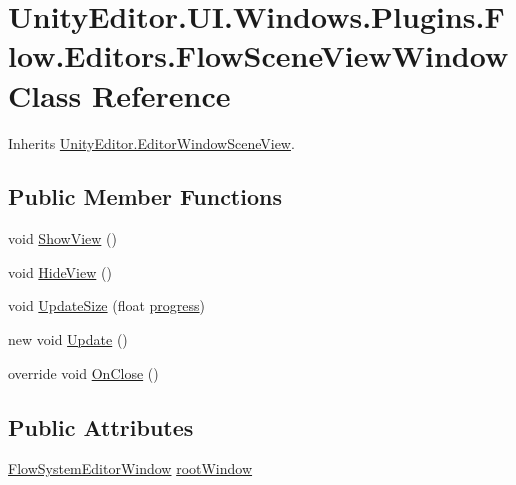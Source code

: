 \hypertarget{class_unity_editor_1_1_u_i_1_1_windows_1_1_plugins_1_1_flow_1_1_editors_1_1_flow_scene_view_window}{}\section{Unity\+Editor.\+U\+I.\+Windows.\+Plugins.\+Flow.\+Editors.\+Flow\+Scene\+View\+Window Class Reference}
\label{class_unity_editor_1_1_u_i_1_1_windows_1_1_plugins_1_1_flow_1_1_editors_1_1_flow_scene_view_window}


Inherits \hyperlink{class_unity_editor_1_1_editor_window_scene_view}{Unity\+Editor.\+Editor\+Window\+Scene\+View}.

\subsection*{Public Member Functions}
\begin{DoxyCompactItemize}
\item 
void \hyperlink{class_unity_editor_1_1_u_i_1_1_windows_1_1_plugins_1_1_flow_1_1_editors_1_1_flow_scene_view_window_abb0703fa7357f3768e2c08521a65cb71}{Show\+View} ()
\item 
void \hyperlink{class_unity_editor_1_1_u_i_1_1_windows_1_1_plugins_1_1_flow_1_1_editors_1_1_flow_scene_view_window_a67296aa0683ffed4fefd23a75face958}{Hide\+View} ()
\item 
void \hyperlink{class_unity_editor_1_1_u_i_1_1_windows_1_1_plugins_1_1_flow_1_1_editors_1_1_flow_scene_view_window_ac05cdeacadf465f54be8dcbd2f5a0c4e}{Update\+Size} (float \hyperlink{class_unity_editor_1_1_editor_window_scene_view_ac23a4737866653a41e680de245a58eff}{progress})
\item 
new void \hyperlink{class_unity_editor_1_1_u_i_1_1_windows_1_1_plugins_1_1_flow_1_1_editors_1_1_flow_scene_view_window_a5abd89b0372fba7bc4aef03cf4e9d763}{Update} ()
\item 
override void \hyperlink{class_unity_editor_1_1_u_i_1_1_windows_1_1_plugins_1_1_flow_1_1_editors_1_1_flow_scene_view_window_acd61ef05ac4955547e7f37238f5bdf76}{On\+Close} ()
\end{DoxyCompactItemize}
\subsection*{Public Attributes}
\begin{DoxyCompactItemize}
\item 
\hyperlink{class_unity_editor_1_1_u_i_1_1_windows_1_1_plugins_1_1_flow_1_1_flow_system_editor_window}{Flow\+System\+Editor\+Window} \hyperlink{class_unity_editor_1_1_u_i_1_1_windows_1_1_plugins_1_1_flow_1_1_editors_1_1_flow_scene_view_window_ae81f98252dbe22df7cae144bdff82d0b}{root\+Window}
\end{DoxyCompactItemize}

